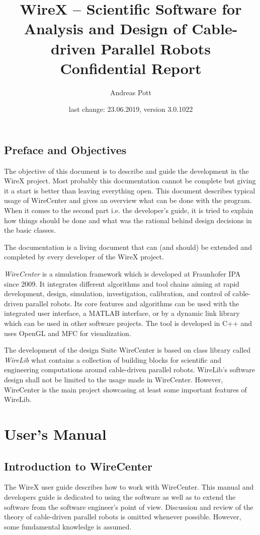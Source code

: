 \documentclass[11pt,a4paper,onepage,openany]{book}
\author{Andreas Pott}
\title{WireX -- Scientific Software for Analysis and Design of Cable-driven
Parallel Robots\\[12em]
Confidential Report}
\date{last change: 23.06.2019, version 3.0.1022}
\begin{document}
\maketitle

\tableofcontents

\chapter{Preface and Objectives}\label{sec:Preface}%
The objective of this document is to describe and guide the development in the
WireX project. Most probably this documentation cannot be complete but giving
it a start is better than leaving everything open. This document describes
typical usage of WireCenter and gives an overview what can be done with the
program. When it comes to the second part i.e. the developer's guide, it is
tried to explain how things should be done and what was the rational behind
design decisions in the basic classes.

The documentation is a living document that can (and should) be extended and
completed by every developer of the WireX project.

\emph{WireCenter} is a simulation framework which is developed at Fraunhofer
IPA since 2009. It integrates different algorithms and tool chains
aiming at rapid development, design, simulation, investigation, calibration,
and control of cable-driven parallel robots. Its core features and algorithms
can be used with the integrated user interface, a MATLAB interface, or by a
dynamic link library which can be used in other software projects. The tool is
developed in C++ and uses OpenGL and MFC for visualization.

The development of the design Suite WireCenter is based on class library called
\emph{WireLib} what contains a collection of building blocks for scientific and
engineering computations around cable-driven parallel robots. WireLib's
software design shall not be limited to the usage made in WireCenter. However,
WireCenter is the main project showcasing at least some important features of
WireLib.

\part{User's Manual}

\chapter{Introduction to WireCenter}\label{sec:IntroducitonWireCenter}%
The WireX user guide describes how to work with WireCenter. This manual and
developers guide is dedicated to using the software as well as to extend the
software from the software engineer's point of view. Discussion and review of
the theory of cable-driven parallel robots is omitted whenever possible.
However, some fundamental knowledge is assumed.
\end{document}
